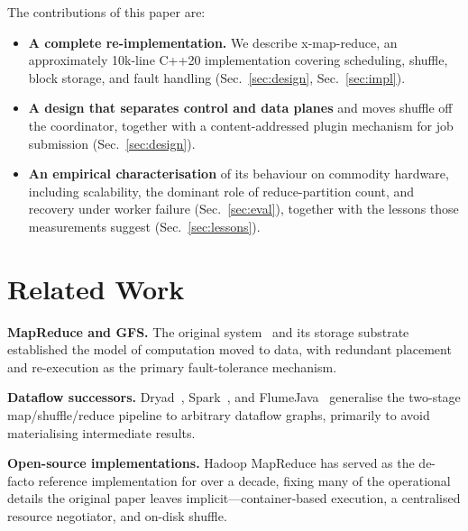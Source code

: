 \documentclass[conference]{IEEEtran}
\begin{document}
The contributions of this paper are:
\begin{itemize}
    \item \textbf{A complete re-implementation.} We describe
          x-map-reduce, an approximately 10k-line C++20 implementation
          covering scheduling, shuffle, block storage, and fault handling
          (Sec.~\ref{sec:design}, Sec.~\ref{sec:impl}).
    \item \textbf{A design that separates control and data planes} and
          moves shuffle off the coordinator, together with a
          content-addressed plugin mechanism for job submission
          (Sec.~\ref{sec:design}).
    \item \textbf{An empirical characterisation} of its behaviour on
          commodity hardware, including scalability, the dominant role of
          reduce-partition count, and recovery under worker failure
          (Sec.~\ref{sec:eval}), together with the lessons those
          measurements suggest (Sec.~\ref{sec:lessons}).
\end{itemize}

\section{Related Work}
\label{sec:related}


\textbf{MapReduce and GFS.} The original system~\cite{dean2004mapreduce}
and its storage substrate~\cite{ghemawat2003gfs} established the model of
computation moved to data, with redundant placement and re-execution as the
primary fault-tolerance mechanism.

\textbf{Dataflow successors.} Dryad~\cite{isard2007dryad},
Spark~\cite{zaharia2012spark}, and FlumeJava~\cite{chambers2010flumejava}
generalise the two-stage map/shuffle/reduce pipeline to arbitrary dataflow
graphs, primarily to avoid materialising intermediate results.

\textbf{Open-source implementations.} Hadoop MapReduce has served as the
de-facto reference implementation for over a decade, fixing many of the
operational details the original paper leaves implicit---container-based
execution, a centralised resource negotiator, and on-disk shuffle.
\end{document}
